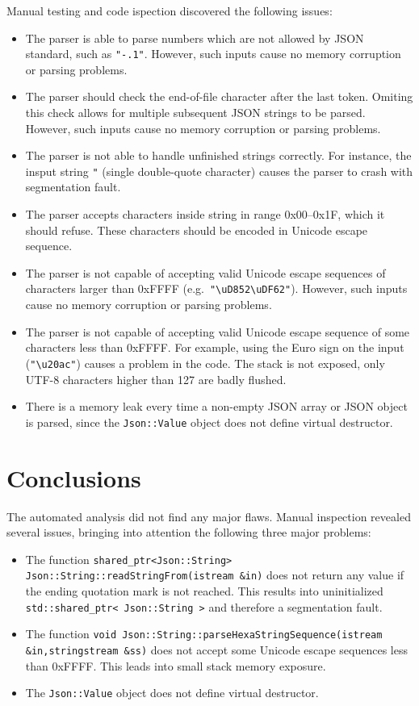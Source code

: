 \documentclass[11pt]{article}
\begin{document}
Manual testing and code ispection discovered the following issues:
\begin{itemize}[itemsep=0pt]
\item The parser is able to parse numbers which are not allowed by JSON standard, such as \texttt{"-.1"}. However, such inputs cause no memory corruption or parsing problems.
\item The parser should check the end-of-file character after the last token. Omiting this check allows for multiple subsequent JSON strings to be parsed. However, such inputs cause no memory corruption or parsing problems.
\item The parser is not able to handle unfinished strings correctly. For instance, the insput string \texttt{"} (single double-quote character) causes the parser to crash with segmentation fault.
\item The parser accepts characters inside string in range 0x00--0x1F, which it should refuse. These characters should be encoded in Unicode escape sequence.
\item The parser is not capable of accepting valid Unicode escape sequences of characters larger than 0xFFFF (e.g.\ \texttt{"\textbackslash{}uD852\textbackslash{}uDF62"}). However, such inputs cause no memory corruption or parsing problems.
\item The parser is not capable of accepting valid Unicode escape sequence of some characters less than 0xFFFF. For example, using the Euro sign on the input (\texttt{"\textbackslash{}u20ac"}) causes a problem in the code. The stack is not exposed, only UTF-8 characters higher than 127 are badly flushed.
\item There is a memory leak every time a non-empty JSON array or JSON object is parsed, since the \texttt{Json::Value} object does not define virtual destructor.
\end{itemize}

\section{Conclusions}

The automated analysis did not find any major flaws. Manual inspection revealed several issues, bringing into attention the following three major problems:
\begin{itemize}[itemsep=0pt]
\item The function \texttt{shared\_ptr<Json::String> Json::String::readStringFrom(istream \&in)} does not return any value if the ending quotation mark is not reached. This results into uninitialized \texttt{std::shared\_ptr< Json::String >} and therefore a segmentation fault.
\item The function \texttt{void Json::String::parseHexaStringSequence(istream \&in,stringstream \&ss)} does not accept some Unicode escape sequences less than 0xFFFF. This leads into small stack memory exposure.
\item The \texttt{Json::Value} object does not define virtual destructor.
\end{itemize}
\end{document}
